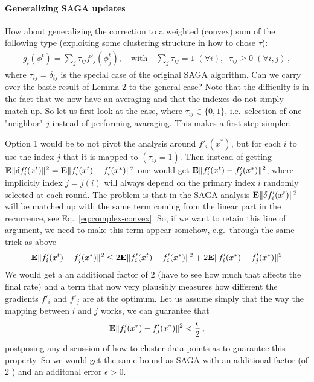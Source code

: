 \documentclass{article}
\newcommand{\E}{{\bf E}}
\begin{document}
\paragraph{Generalizing SAGA updates}

How about generalizing the correction to a weighted (convex) sum of the following type (exploiting some clustering structure in how to chose $\tau$): 
\begin{align}
g_i(\phi^t) = \sum_{j} \tau_{ij} f'_j(\phi^t_j), \quad \text{with} \quad \sum_{j} \tau_{ij} =1 \; (\forall i), \;\; \tau_{ij} \geq 0 \; (\forall i,j)\,,
\end{align}
where $\tau_{ij} = \delta_{ij}$ is the special case of the original SAGA algorithm. Can we carry over the basic result of Lemma 2 to the general case? Note that the difficulty is in the fact that we now have an averaging and that the indexes do not simply match up. So let us first look at the case, where $\tau_{ij} \in \{0,1\}$, i.e.~selection of one "neighbor" $j$ instead of performing avaraging.  This makes a first step simpler.  

Option 1 would be to not pivot the analysis around $f'_i(x^*)$, but for each $i$ to use the index $j$ that it is mapped to $(\tau_{ij}=1)$. Then instead of getting $\E\| \delta f_i'(x^t)\|^2 = \E \| f'_i(x^t) - f_i'(x^*)\|^2$ one would get $\E \|f'_i(x^t) - f_j'(x^*)\|^2$, where implicitly index $j=j(i)$ will always depend on the primary index $i$ randomly selected at each round.  The problem is that in the SAGA analysis $\E\| \delta f_i'(x^t)\|^2$ will be matched up with the same term coming from the linear part in the recurrence, see Eq.~\eqref{eq:complex-convex}. So, if we want to retain this line of argument, we need to make this term appear somehow, e.g.~through the same trick as above 
\begin{align}
\E \|f'_i(x^t) - f_j'(x^*)\|^2 \leq 2 \E\| f'_i(x^t) - f'_i(x^*) \|^2 + 2\E \| f'_i(x^*) - f'_j(x^*)\|^2
\label{eq:bound_ij}
\end{align}
We would get a an additional factor of $2$ (have to see how much that affects the final rate) and a term that now very plausibly measures how different the gradients $f'_i$ and $f'_j$ are at the optimum. Let us assume simply that the way the mapping between $i$ and $j$ works, we can guarantee that 
\begin{align}
\E \| f'_i(x^*) - f'_j(x^*)\|^2 < \frac \epsilon 2\,,
\end{align}
postposing any discussion of how to cluster data points as to guarantee this property. So we would get the same bound as SAGA with an additional factor (of $2$ ) and an additonal error $\epsilon>0$. 
\end{document}
